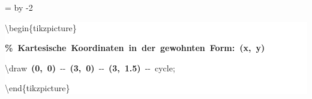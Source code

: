 \begingroup
\ttfamily
{}
=\textwidth
\advance{} by -2\fboxsep
\noindent
\colorbox{background}
{%
\parbox{\dimen255}
{%
\rule[-0.5ex]{0pt}{2.5ex}\hspace*{0.0em}\textbackslash{}begin\{tikzpicture\}\\
\rule[-0.5ex]{0pt}{2.5ex}\hspace*{1.0em}\textcolor{G}{\textbf{\%~Kartesische~Koordinaten~in~der~gewohnten~Form:~(x,~y)}}\\
\rule[-0.5ex]{0pt}{2.5ex}\hspace*{1.0em}\textbackslash{}draw~\textcolor{R}{\textbf{(0,~0)}}~{-}{-}~\textcolor{R}{\textbf{(3,~0)}}~{-}{-}~\textcolor{R}{\textbf{(3,~1.5)}}~{-}{-}~cycle;\\
\rule[-0.5ex]{0pt}{2.5ex}\hspace*{0.0em}\textbackslash{}end\{tikzpicture\}}%
}%
\endgroup
